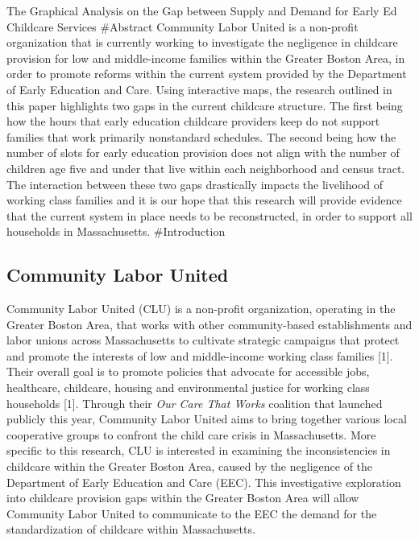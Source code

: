 \documentclass[10pt,letterpaper]{article}
\begin{document}
\linenumbers

The Graphical Analysis on the Gap between Supply and Demand for Early Ed
Childcare Services \#Abstract Community Labor United is a non-profit
organization that is currently working to investigate the negligence in
childcare provision for low and middle-income families within the
Greater Boston Area, in order to promote reforms within the current
system provided by the Department of Early Education and Care. Using
interactive maps, the research outlined in this paper highlights two
gaps in the current childcare structure. The first being how the hours
that early education childcare providers keep do not support families
that work primarily nonstandard schedules. The second being how the
number of slots for early education provision does not align with the
number of children age five and under that live within each neighborhood
and census tract. The interaction between these two gaps drastically
impacts the livelihood of working class families and it is our hope that
this research will provide evidence that the current system in place
needs to be reconstructed, in order to support all households in
Massachusetts. \#Introduction

\subsection{Community Labor United}\label{community-labor-united}

Community Labor United (CLU) is a non-profit organization, operating in
the Greater Boston Area, that works with other community-based
establishments and labor unions across Massachusetts to cultivate
strategic campaigns that protect and promote the interests of low and
middle-income working class families {[}1{]}. Their overall goal is to
promote policies that advocate for accessible jobs, healthcare,
childcare, housing and environmental justice for working class
households {[}1{]}. Through their \emph{Our Care That Works} coalition
that launched publicly this year, Community Labor United aims to bring
together various local cooperative groups to confront the child care
crisis in Massachusetts. More specific to this research, CLU is
interested in examining the inconsistencies in childcare within the
Greater Boston Area, caused by the negligence of the Department of Early
Education and Care (EEC). This investigative exploration into childcare
provision gaps within the Greater Boston Area will allow Community Labor
United to communicate to the EEC the demand for the standardization of
childcare within Massachusetts.
\end{document}
